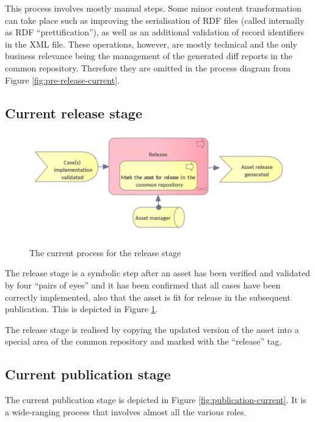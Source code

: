 	\enlargethispage{1em}
	
	This process involves mostly manual steps. Some minor content transformation can take place such as improving the serialisation of RDF files (called internally as RDF ``prettification''), as well as an additional validation of record identifiers in the XML file. These operations, however, are mostly technical and the only business relevance being the management of the generated diff reports in the common repository. Therefore they are omitted in the process diagram from Figure \ref{fig:pre-release-current}. 

	\subsection{Current release stage}
	\label{sec:release-current}
	
	\begin{figure}[h]
		\centering
		\includegraphics[width=.6\textwidth]{images/business/current/Release.png}
		\caption{The current process for the release stage}
		\label{fig:release-current}
	\end{figure}

	The release stage is a symbolic step after an asset has been verified and validated by four ``pairs of eyes'' and it has been confirmed that all cases have been correctly implemented, also that the asset is fit for release in the subsequent publication. This is depicted in Figure \ref{fig:release-current}.

	The release stage is realised by copying the updated version of the asset into a special area of the common repository and marked with the ``release'' tag.

	\subsection{Current publication stage}
	
	The current publication stage is depicted in Figure \ref{fig:publication-current}. It is a wide-ranging process that involves almost all the various roles. 
	
